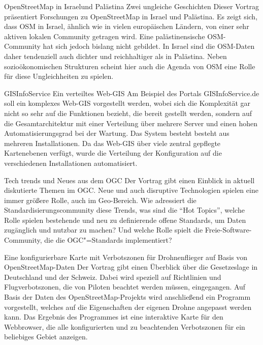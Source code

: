 %
{OpenStreetMap in Israel\linebreak und Palästina\vspace{0.2em}}%
{Zwei ungleiche Geschichten}%
{%
Dieser Vortrag präsentiert Forschungen zu OpenStreetMap in Israel und Palästina. Es zeigt
sich, dass OSM in Israel, ähnlich wie in vielen europäischen Ländern, von einer
sehr aktiven lokalen Community getragen wird. Eine palästinensische
OSM-Community hat sich jedoch bislang nicht gebildet. In Israel sind die
OSM-Daten daher tendenziell auch dichter und reichhaltiger als in Palästina.
Neben sozioökonomischen Strukturen scheint hier auch die Agenda von OSM eine
Rolle für diese Ungleichheiten zu spielen.%
}


%
{GISInfoService}%
{Ein verteiltes Web-GIS}%
{%
Am Beispiel des Portals GISInfoService.de soll ein komplexes Web-GIS
vorgestellt werden, wobei sich die Komplexität gar nicht so sehr auf die
Funktionen bezieht, die bereit gestellt werden, sondern auf die
Gesamtarchitektur mit einer Verteilung über mehrere Server und einen hohen
Automatisierungsgrad bei der Wartung. Das System besteht besteht aus mehreren
Installationen. Da das Web-GIS über viele zentral gepflegte Kartenebenen
verfügt, wurde die Verteilung der Konfiguration auf die verschiedenen
Installationen automatisiert.%
}

%
{Tech trends und Neues aus dem OGC}%
{}%
{%
Der Vortrag gibt einen Einblick in aktuell diskutierte Themen im OGC. Neue und
auch disruptive Technologien spielen eine immer größere Rolle, auch im
Geo-Bereich. Wie adressiert die Standardisierungscommunity diese Trends, was
sind die "`Hot Topics"', welche Rolle spielen bestehende und neu zu
definierende offene Standards, um Daten zugänglich und nutzbar zu machen? Und
welche Rolle spielt die Freie-Software-Community, die die OGC"=Standards
implementiert?%
}

%
{Eine konfigurierbare Karte mit \mbox{Verbotszonen} für Drohnenflieger auf Basis von OpenStreetMap-Daten}%
{}%
{%
Der Vortrag gibt einen Überblick über die Gesetzeslage in Deutschland und der
Schweiz. Dabei wird speziell auf Richtlinien und Flugverbotszonen, die von
Piloten beachtet werden müssen, eingegangen. Auf Basis der Daten des
OpenStreetMap-Projekts wird anschließend ein Programm vorgestellt, welches auf
die Eigenschaften der eigenen Drohne angepasst werden kann. Das Ergebnis des
Programmes ist eine interaktive Karte für den Webbrowser, die alle
konfigurierten und zu beachtenden Verbotszonen für ein beliebiges Gebiet
anzeigen.%
}

